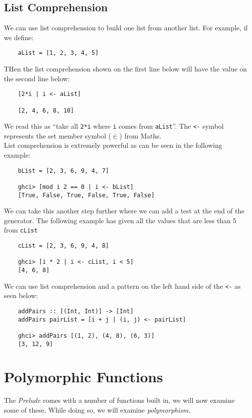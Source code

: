 \subsection{List Comprehension}
We can use list comprehension to build one list from another list. For example, if we define:
\begin{verbatim}
    aList = [1, 2, 3, 4, 5]
\end{verbatim}
THen the list comprehension shown  on the first line below will have the value on the second line below:
\begin{verbatim}
    [2*i | i <- aList]
    
    [2, 4, 6, 8, 10]
\end{verbatim}

We read this as ``take all \verb|2*i| where \verb|i| comes from  \verb|aList|''. The \verb|<-| symbol represents the set member symbol ($\in$) from Maths.\\

List comprehension is extremely powerful as can be seen in the following example:
\begin{verbatim}
    bList = [2, 3, 6, 9, 4, 7]

    ghci> [mod i 2 == 0 | i <- bList]
    [True, False, True, False, True, False]
\end{verbatim}
We can take this another step further where we can add a test at the end of the generator. The following example has given all the values that are less than 5 from \verb|cList|
\begin{verbatim}
    cList = [2, 3, 6, 9, 4, 8]

    ghci> [i * 2 | i <- cList, i < 5]
    [4, 6, 8]
\end{verbatim}

We can use list comprehension and a pattern on the left hand side of the \verb|<-| as seen below:
\begin{verbatim}
    addPairs :: [(Int, Int)] -> [Int]
    addPairs pairList = [i + j | (i, j) <- pairList]

    ghci> addPairs [(1, 2), (4, 8), (6, 3)]
    [3, 12, 9]
\end{verbatim}


\section{Polymorphic Functions}
The \textit{Prelude} comes with a number of functions built in, we will now examine some of these. While doing so, we will examine \textit{polymorphism}.\\

